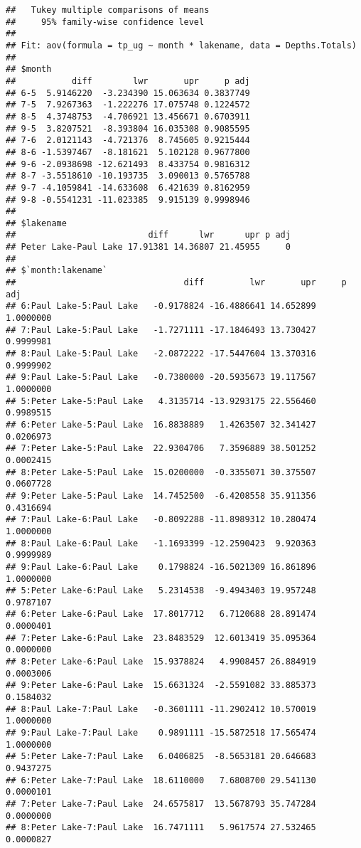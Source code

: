 \documentclass[]{article}
\begin{document}
\begin{verbatim}
##   Tukey multiple comparisons of means
##     95% family-wise confidence level
## 
## Fit: aov(formula = tp_ug ~ month * lakename, data = Depths.Totals)
## 
## $month
##           diff        lwr       upr     p adj
## 6-5  5.9146220  -3.234390 15.063634 0.3837749
## 7-5  7.9267363  -1.222276 17.075748 0.1224572
## 8-5  4.3748753  -4.706921 13.456671 0.6703911
## 9-5  3.8207521  -8.393804 16.035308 0.9085595
## 7-6  2.0121143  -4.721376  8.745605 0.9215444
## 8-6 -1.5397467  -8.181621  5.102128 0.9677800
## 9-6 -2.0938698 -12.621493  8.433754 0.9816312
## 8-7 -3.5518610 -10.193735  3.090013 0.5765788
## 9-7 -4.1059841 -14.633608  6.421639 0.8162959
## 9-8 -0.5541231 -11.023385  9.915139 0.9998946
## 
## $lakename
##                          diff      lwr      upr p adj
## Peter Lake-Paul Lake 17.91381 14.36807 21.45955     0
## 
## $`month:lakename`
##                                 diff         lwr       upr     p adj
## 6:Paul Lake-5:Paul Lake   -0.9178824 -16.4886641 14.652899 1.0000000
## 7:Paul Lake-5:Paul Lake   -1.7271111 -17.1846493 13.730427 0.9999981
## 8:Paul Lake-5:Paul Lake   -2.0872222 -17.5447604 13.370316 0.9999902
## 9:Paul Lake-5:Paul Lake   -0.7380000 -20.5935673 19.117567 1.0000000
## 5:Peter Lake-5:Paul Lake   4.3135714 -13.9293175 22.556460 0.9989515
## 6:Peter Lake-5:Paul Lake  16.8838889   1.4263507 32.341427 0.0206973
## 7:Peter Lake-5:Paul Lake  22.9304706   7.3596889 38.501252 0.0002415
## 8:Peter Lake-5:Paul Lake  15.0200000  -0.3355071 30.375507 0.0607728
## 9:Peter Lake-5:Paul Lake  14.7452500  -6.4208558 35.911356 0.4316694
## 7:Paul Lake-6:Paul Lake   -0.8092288 -11.8989312 10.280474 1.0000000
## 8:Paul Lake-6:Paul Lake   -1.1693399 -12.2590423  9.920363 0.9999989
## 9:Paul Lake-6:Paul Lake    0.1798824 -16.5021309 16.861896 1.0000000
## 5:Peter Lake-6:Paul Lake   5.2314538  -9.4943403 19.957248 0.9787107
## 6:Peter Lake-6:Paul Lake  17.8017712   6.7120688 28.891474 0.0000401
## 7:Peter Lake-6:Paul Lake  23.8483529  12.6013419 35.095364 0.0000000
## 8:Peter Lake-6:Paul Lake  15.9378824   4.9908457 26.884919 0.0003006
## 9:Peter Lake-6:Paul Lake  15.6631324  -2.5591082 33.885373 0.1584032
## 8:Paul Lake-7:Paul Lake   -0.3601111 -11.2902412 10.570019 1.0000000
## 9:Paul Lake-7:Paul Lake    0.9891111 -15.5872518 17.565474 1.0000000
## 5:Peter Lake-7:Paul Lake   6.0406825  -8.5653181 20.646683 0.9437275
## 6:Peter Lake-7:Paul Lake  18.6110000   7.6808700 29.541130 0.0000101
## 7:Peter Lake-7:Paul Lake  24.6575817  13.5678793 35.747284 0.0000000
## 8:Peter Lake-7:Paul Lake  16.7471111   5.9617574 27.532465 0.0000827

\end{verbatim}
\end{document}
